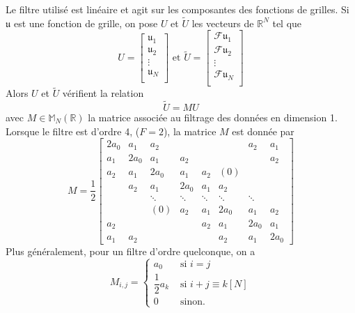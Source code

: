Le filtre utilisé est linéaire et agit sur les composantes des fonctions de grilles. Si $\mathfrak{u}$ est une fonction de grille, on pose $U$ et $\tilde{U}$ les vecteurs de $\mathbb{R}^N$ tel que
\begin{equation}
U = \begin{bmatrix}
\mathfrak{u}_1\\
\mathfrak{u}_2\\
\vdots \\
\mathfrak{u}_N\\
\end{bmatrix} \text{ et } 
\tilde{U} = \begin{bmatrix}
\mathcal{F}\mathfrak{u}_1\\
\mathcal{F}\mathfrak{u}_2\\
\vdots \\
\mathcal{F}\mathfrak{u}_N\\
\end{bmatrix}
\end{equation}
Alors $U$ et $\tilde{U}$ vérifient la relation
\begin{equation}
\tilde{U} = M U
\end{equation}
avec $M \in \mathbb{M}_N \left( \mathbb{R} \right)$ la matrice associée au filtrage des données en dimension 1. Lorsque le filtre est d'ordre 4, ($F=2$), la matrice $M$ est donnée par
\begin{equation}
M = \dfrac{1}{2}
\begin{bmatrix}
2a_0 & a_1 & a_2 &   &   &   & a_2 & a_1 \\ 
a_1 & 2 a_0 & a_1 & a_2 &   &   &   & a_2 \\ 
a_2 & a_1 & 2a_0 & a_1 & a_2 & (0) &   &   \\ 
  & a_2 & a_1 & 2a_0 & a_1 & a_2 &   &   \\ 
  &   & \ddots & \ddots & \ddots & \ddots & \ddots &   \\ 
  &   & (0) & a_2 & a_1 & 2 a_0 & a_1 & a_2 \\ 
a_2 &   &   &   & a_2 & a_1 & 2a_0 & a_1 \\ 
a_1 & a_2 &   &   &   & a_2 & a_1 & 2a_0
\end{bmatrix}
\end{equation}
Plus généralement, pour un filtre d'ordre quelconque, on a
\begin{equation}
M_{i,j} = \left\lbrace
\begin{array}{cl}
a_0 & \text{ si } i=j \\
\dfrac{1}{2} a_k & \text{ si } i+j \equiv k [N]\\
0 & \text{ sinon.}
\end{array}
\right.
\end{equation}
